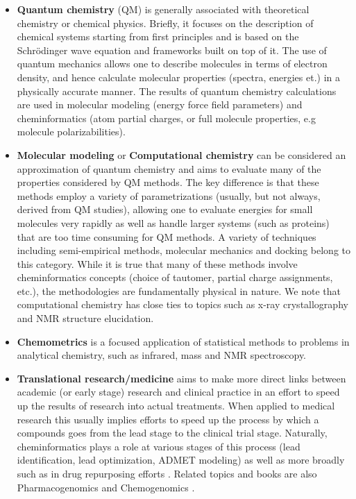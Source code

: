 \documentclass{sig-alternate}
\begin{document}
\begin{itemize}
\item \textbf{Quantum chemistry} (QM) is generally associated with
  theoretical chemistry or chemical physics. Briefly, it focuses on
  the description of chemical systems starting from first principles
  and is based on the Schr\"{o}dinger wave equation and frameworks
  built on top of it. The use of quantum mechanics allows one to
  describe molecules in terms of electron density, and hence calculate
  molecular properties (spectra, energies et.) in a physically
  accurate manner.  The results of quantum chemistry calculations are
  used in molecular modeling (energy force field parameters) and
  cheminformatics (atom partial charges, or full molecule properties,
  e.g molecule polarizabilities).
\item \textbf{Molecular modeling} or \textbf{Computational chemistry}
  can be considered an approximation of quantum chemistry and aims to
  evaluate many of the properties considered by QM methods. The key
  difference is that these methods employ a variety of
  parametrizations (usually, but not always, derived from QM studies),
  allowing one to evaluate energies for small molecules very rapidly
  as well as handle larger systems (such as proteins) that are too
  time consuming for QM methods. A variety of techniques including
  semi-empirical methods, molecular mechanics and docking belong to
  this category. While it is true that many of these methods involve
  cheminformatics concepts (choice of tautomer, partial charge
  assignments, etc.), the methodologies are fundamentally physical in
  nature. We note that computational chemistry has close ties to
  topics such as x-ray crystallography and NMR structure elucidation.
\item \textbf{Chemometrics} is a focused application of statistical
  methods to problems in analytical chemistry, such as infrared, mass
  and NMR spectroscopy.
\item \textbf{Translational research/medicine} aims to make more
  direct links between academic (or early stage) research and clinical
  practice in an effort to speed up the results of research into
  actual treatments. When applied to medical research this usually
  implies efforts to speed up the process by which a compounds goes
  from the lead stage to the clinical trial stage. Naturally,
  cheminformatics plays a role at various stages of this process (lead
  identification, lead optimization, ADMET modeling) as well as more
  broadly such as in drug repurposing
  efforts \cite{Dudley:2011fk,Swamidass:2011uq}. Related topics and
  books are also Pharmacogenomics \cite{yan2008pharmacogenomics} and
  Chemogenomics \cite{kubinyi2004chemogenomics}.
\end{itemize}
\end{document}
